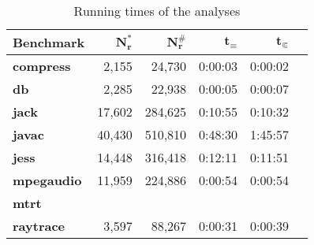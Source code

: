 \begin{table}[h]
\caption{Running times of the analyses}\label{tab:runtimes}
\centering
\setlength{\tabcolsep}{2ex}
\begin{tabular}{lrrrrr}
\toprule
\textbf{Benchmark}   & $\bm{N^*_r}$ & $\bm{N^\#_r}$ & $\bm{t_\equiv}$ & $\bm{t_{\Subset}}$ \\ \midrule
\textbf{compress}    & 2,155        & 24,730        & 0:00:03         & 0:00:02            \\
\textbf{db}          & 2,285        & 22,938        & 0:00:05         & 0:00:07            \\
\textbf{jack}        & 17,602       & 284,625       & 0:10:55         & 0:10:32            \\
\textbf{javac}       & 40,430       & 510,810       & 0:48:30         & 1:45:57            \\
\textbf{jess}        & 14,448       & 316,418       & 0:12:11         & 0:11:51            \\
\textbf{mpegaudio}   & 11,959       & 224,886       & 0:00:54         & 0:00:54            \\
\textbf{mtrt}        &              &               &                 &                    \\
\textbf{raytrace}    & 3,597        & 88,267        & 0:00:31         &                   0:00:39 \\ \bottomrule
\end{tabular}
\end{table}
